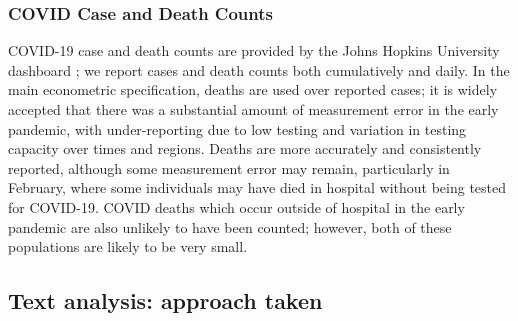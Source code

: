 \documentclass[12pt,a4]{article}
\begin{document}
\subsubsection{COVID Case and Death Counts}
COVID-19 case and death counts are provided by the Johns Hopkins University dashboard \parencite{dongInteractiveWebbasedDashboard2020}; we report cases and death counts both cumulatively and daily. In the main econometric specification, deaths are used over reported cases; it is widely accepted that there was a substantial amount of measurement error in the early pandemic, with under-reporting due to low testing and variation in testing capacity over times and regions. Deaths are more accurately and consistently reported, although some measurement error may remain, particularly in February, where some individuals may have died in hospital without being tested for COVID-19. COVID deaths which occur outside of hospital in the early pandemic are also unlikely to have been counted; however, both of these populations are likely to be very small. 

\subsection{Text analysis: approach taken}\label{approach}
\end{document}
